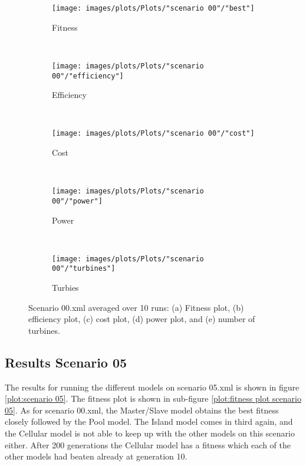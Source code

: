 \begin{figure}[h!]
    \centering
      \begin{subfigure}[b]{0.45\textwidth}
        \texttt{[image: images/plots/Plots/"scenario 00"/"best"]}
        \caption{Fitness}
        \hfill
        \label{plot:fitness plot scenario 00}
    \end{subfigure}
    ~
      \begin{subfigure}[b]{0.45\textwidth}
        \texttt{[image: images/plots/Plots/"scenario 00"/"efficiency"]}
        \caption{Efficiency}
        \hfill
        \label{plot:efficiency plot scenario 00}
    \end{subfigure}
    ~
    \begin{subfigure}[b]{0.45\textwidth}
        \texttt{[image: images/plots/Plots/"scenario 00"/"cost"]}
        \caption{Cost}
        \hfill
        \label{plot:cost plot scenario 00}
    \end{subfigure}
    ~
    \begin{subfigure}[b]{0.45\textwidth}
        \texttt{[image: images/plots/Plots/"scenario 00"/"power"]}
        \caption{Power}
        \hfill
        \label{plot:power plot scenario 00}
    \end{subfigure}
    ~
    \begin{subfigure}[b]{0.45\textwidth}
        \texttt{[image: images/plots/Plots/"scenario 00"/"turbines"]}
        \caption{Turbies}
        \hfill
        \label{plot:turbines plot scenario 00}
    \end{subfigure}
    \caption{Scenario 00.xml averaged over 10 runs: (a) Fitness plot, (b) efficiency plot, (c) cost plot, (d) power plot, and (e) number of turbines.}
    \label{plot:scenario 00}
\end{figure}


\subsection{Results Scenario 05}
The results for running the different models on scenario 05.xml is shown in figure \ref{plot:scenario 05}. The fitness plot is shown in sub-figure \ref{plot:fitness plot scenario 05}. As for scenario 00.xml, the Master/Slave model obtains the best fitness closely followed by the Pool model. The Island model comes in third again, and the Cellular model is not able to keep up with the other models on this scenario either. After 200 generations the Cellular model has a fitness which each of the other models had beaten already at generation 10.\\

